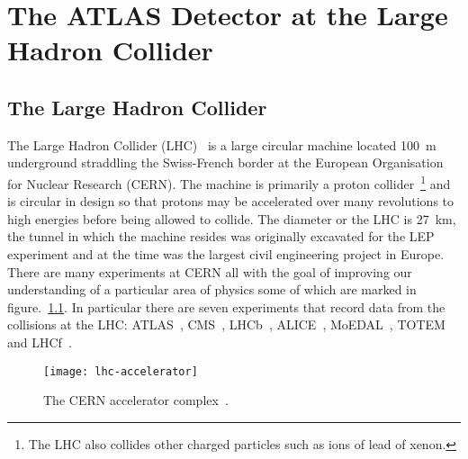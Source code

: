  \chapter{The ATLAS Detector at the Large Hadron Collider}%
\label{sec:detector}

\section{The Large Hadron Collider}%
\label{sec:lhc}%
The Large Hadron Collider (LHC)~\cite{LHC-dr} is a large circular machine
located 100~m underground straddling the Swiss-French border at the European
Organisation for Nuclear Research (CERN). The machine is primarily a proton
collider~\footnote{The LHC also collides other charged particles such as ions of
  lead of xenon.} and is circular in design so that protons may be accelerated
over many revolutions to high energies before being allowed to collide. The
diameter or the LHC is 27~km, the tunnel in which the machine resides was
originally excavated for the LEP~\cite{LEP} experiment and at the time was the
largest civil engineering project in Europe. There are many experiments at CERN
all with the goal of improving our understanding of a particular area of
physics some of which are marked in figure.~\ref{fig:lhc-acc}. In particular
there are seven experiments that record data from the collisions at the LHC:
ATLAS~\cite{ATLAS-loi}, CMS~\cite{CMS-loi}, LHCb~\cite{lhcb-loi},
ALICE~\cite{ALICE-loi}, MoEDAL~\cite{MoEDAL-loi}, TOTEM~\cite{TOTEM-loi} and
LHCf~\cite{lhcf-loi}.
\begin{figure}[h]
  \centering
  \texttt{[image: lhc-accelerator]}
  \caption{The CERN accelerator complex~\cite{LHC-acc-fig}.}%
  \label{fig:lhc-acc}
\end{figure}


